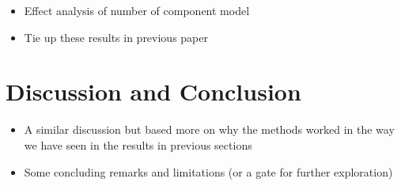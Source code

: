\documentclass[12pt,3p,authoryear]{elsarticle}
\providecommand{\tightlist}{%
  \setlength{\itemsep}{0pt}\setlength{\parskip}{0pt}}
\begin{document}
\begin{itemize}
\tightlist
\item
  Effect analysis of number of component model
\item
  Tie up these results in previous paper
\end{itemize}

\section{Discussion and Conclusion}\label{discussion-and-conclusion}

\begin{itemize}
\tightlist
\item
  A similar discussion but based more on why the methods worked in the
  way we have seen in the results in previous sections
\item
  Some concluding remarks and limitations (or a gate for further
  exploration)
\end{itemize}


\renewcommand\refname{References}

\end{document}
